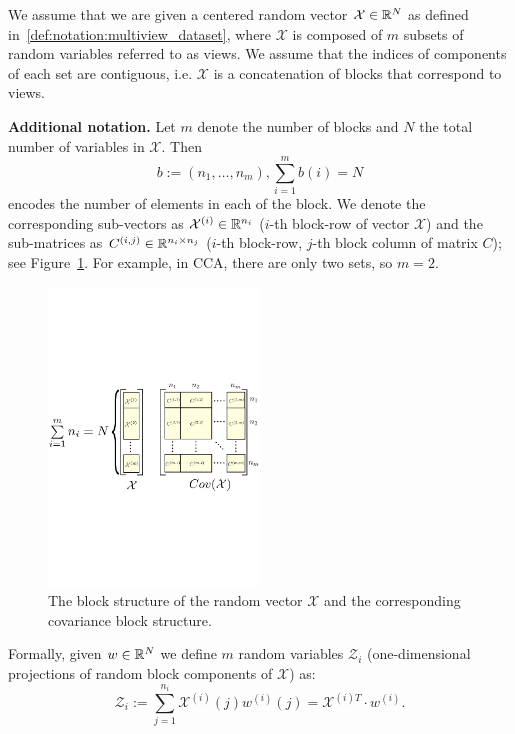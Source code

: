 We assume that we are given a centered random vector $\mathcal{X} \in \mathbb{R}^N$ as defined in~\ref{def:notation:multiview_dataset},
where $\mathcal{X}$ is composed of $m$ subsets of random variables referred to as views. We assume that the indices of components
of each set are contiguous, i.e. $\mathcal{X}$ is a concatenation of blocks that correspond to views.

\noindent\textbf{Additional notation.} 
Let $m$ denote the number of blocks and $N$ the total number of
variables in $\mathcal{X}$. Then
$$b := \left(n_1, \ldots, n_m\right), \sum_{i=1}^m b\left(i\right) = N$$
encodes the number of elements in each of the block. We denote the corresponding
sub-vectors as $\mathcal{X}^{(i)} \in \mathbb{R}^{n_i}$
($i$-th block-row of vector $\mathcal{X}$) and the sub-matrices as $C^{(i,j)} \in \mathbb{R}^{n_i \times n_j}$ 
($i$-th block-row, $j$-th block column of matrix $C$); see Figure~\ref{fig:block_structure}. 
For example, in CCA, there are only two sets, so $m=2$.
\begin{figure}[t]
\centering
\includegraphics[width=0.5\textwidth]{figures/block_structure.pdf}
\caption{\label{fig:block_structure} The block structure of the  random vector $\mathcal{X}$ and the corresponding covariance block structure.}
\end{figure}

Formally, given $w \in \mathbb{R}^N$ we define $m$ random variables $\mathcal{Z}_i$ (one-dimensional 
projections of random block components of $\mathcal{X}$) as:
\begin{equation*}
\mathcal{Z}_i := \sum_{j = 1}^{n_i} \mathcal{X}^{(i)}\left(j\right)
w^{(i)}\left(j\right) = \mathcal{X}^{(i)T} \cdot w^{(i)}.
\end{equation*}

